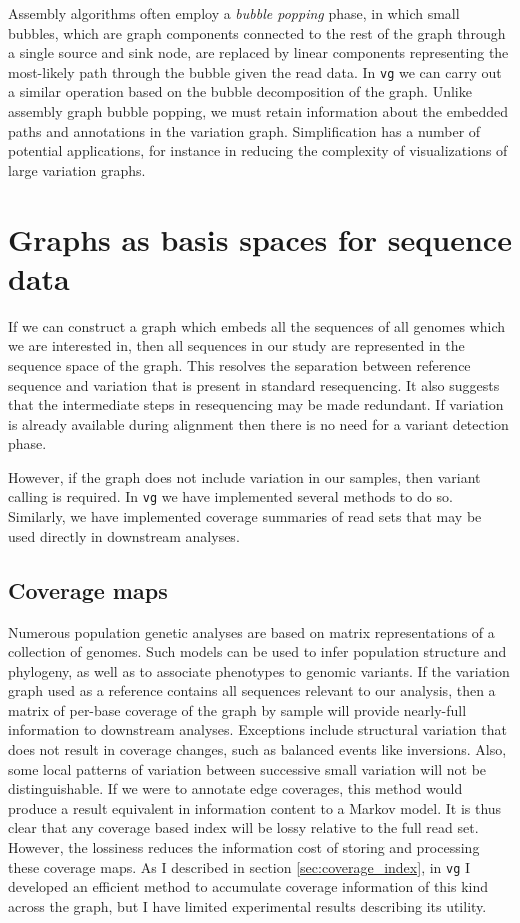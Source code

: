 Assembly algorithms often employ a \emph{bubble popping} phase, in which small bubbles, which are graph components connected to the rest of the graph through a single source and sink node, are replaced by linear components representing the most-likely path through the bubble given the read data.
In {\tt vg} we can carry out a similar operation based on the bubble decomposition of the graph.
Unlike assembly graph bubble popping, we must retain information about the embedded paths and annotations in the variation graph.
Simplification has a number of potential applications, for instance in reducing the complexity of visualizations of large variation graphs.

\section{Graphs as basis spaces for sequence data}
\label{sec:basis_space}

If we can construct a graph which embeds all the sequences of all genomes which we are interested in, then all sequences in our study are represented in the sequence space of the graph.
This resolves the separation between reference sequence and variation that is present in standard resequencing.
It also suggests that the intermediate steps in resequencing may be made redundant.
If variation is already available during alignment then there is no need for a variant detection phase.

However, if the graph does not include variation in our samples, then variant calling is required.
In {\tt vg} we have implemented several methods to do so.
Similarly, we have implemented coverage summaries of read sets that may be used directly in downstream analyses.

\subsection{Coverage maps}

Numerous population genetic analyses are based on matrix representations of a collection of genomes.
Such models can be used to infer population structure and phylogeny, as well as to associate phenotypes to genomic variants.
If the variation graph used as a reference contains all sequences relevant to our analysis, then a matrix of per-base coverage of the graph by sample will provide nearly-full information to downstream analyses.
Exceptions include structural variation that does not result in coverage changes, such as balanced events like inversions.
Also, some local patterns of variation between successive small variation will not be distinguishable.
If we were to annotate edge coverages, this method would produce a result equivalent in information content to a Markov model.
It is thus clear that any coverage based index will be lossy relative to the full read set.
However, the lossiness reduces the information cost of storing and processing these coverage maps.
As I described in section \ref{sec:coverage_index}, in {\tt vg} I developed an efficient method to accumulate coverage information of this kind across the graph, but I have limited experimental results describing its utility.


